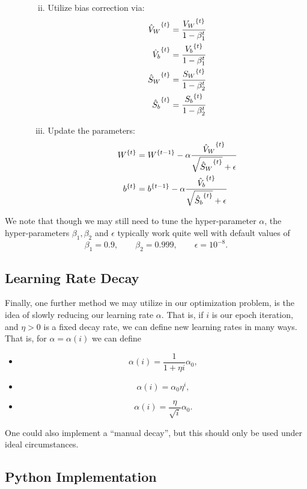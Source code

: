\begin{enumerate}
\begin{enumerate}[a.]
\begin{enumerate}[i.]
\begin{align*}
			\end{align*}
			\item Utilize bias correction via:
			\begin{align*}
				{\hat{V}_W}^{\{{t}\}}&=\frac{{V_W}^{\{{t}\}}}{1-\beta_1^t}\\
				{\hat{V}_b}^{\{{t}\}}&=\frac{{V_b}^{\{{t}\}}}{1-\beta_1^t}\\
				{\hat{S}_W}^{\{{t}\}}&=\frac{{S_W}^{\{{t}\}}}{1-\beta_2^t}\\
				{\hat{S}_b}^{\{{t}\}}&=\frac{{S_b}^{\{{t}\}}}{1-\beta_2^t}
			\end{align*}
			\item Update the parameters:
			\begin{align*}
				{W}^{\{{t}\}}&={W}^{\{{t-1}\}}-\alpha\frac{{\hat{V}_W}^{\{{t}\}}}{\sqrt{{\hat{S}_W}^{\{{t}\}}}+\epsilon}\\
				{b}^{\{{t}\}}&={b}^{\{{t-1}\}}-\alpha\frac{{\hat{V}_b}^{\{{t}\}}}{\sqrt{{\hat{S}_b}^{\{{t}\}}}+\epsilon}
			\end{align*}
		\end{enumerate}
	\end{enumerate}
\end{enumerate}

We note that though we may still need to tune the hyper-parameter $\alpha$, the hyper-parameters $\beta_1,\beta_2$ and $\epsilon$ typically work quite well with default values of
$$\beta_1=0.9,\qquad\beta_2=0.999,\qquad\epsilon=10^{-8}.$$



\subsection{Learning Rate Decay}

Finally, one further method we may utilize in our optimization problem, is the idea of slowly reducing our learning rate $\alpha$.  That is, if $i$ is our epoch iteration, and $\eta>0$ is a fixed decay rate, we can define new learning rates in many ways.  That is, for $\alpha=\alpha(i)$ we can define
\begin{itemize}
	\item $$\alpha(i)=\frac{1}{1+\eta i}\alpha_0,$$
	\item $$\alpha(i)=\alpha_0\eta^i,$$
	\item $$\alpha(i)=\frac{\eta}{\sqrt{i}}\alpha_0.$$
\end{itemize}
One could also implement a ``manual decay'', but this should only be used under ideal circumstances.



\subsection{Python Implementation}







